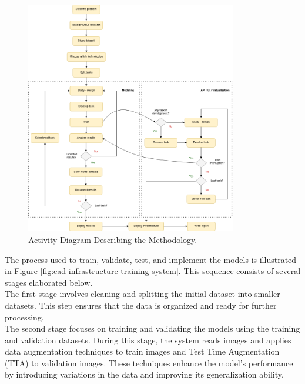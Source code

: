\newpage

\begin{landscape}

  \begin{figure}[H]
  \centering
  \includegraphics[width=0.82\textwidth]{imatges/planing_and_methodology/EmplyedMethodology.png}
  \caption{Activity Diagram Describing the Methodology.}
  \label{fig:flux_development}
  \end{figure}

\end{landscape}


The process used to train, validate, test, and implement the models is
illustrated in Figure \ref{fig:cad-infrastructure-training-system}. This
sequence consists of several stages elaborated below. \\

The first stage involves cleaning and splitting the initial dataset into
smaller datasets. This step ensures that the data is organized and ready for
further processing. \\

The second stage focuses on training and validating the models using the
training and validation datasets. During this stage, the system reads images
and applies data augmentation techniques to train images and Test Time
Augmentation (TTA) to validation images. These techniques enhance the model's
performance by introducing variations in the data and improving its
generalization ability. \\

